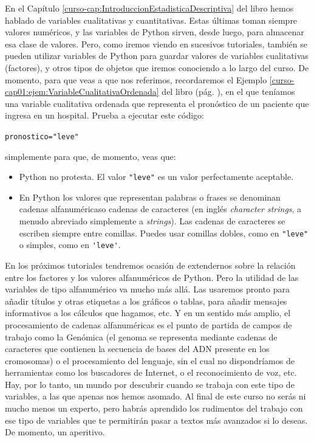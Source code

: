 \documentclass[10pt,a4paper]{article}\usepackage[]{graphicx}\usepackage[]{color}
\makeatletter
\newcommand{\hlstr}[1]{\textcolor[rgb]{0.192,0.494,0.8}{#1}}%
\newcommand{\hlstd}[1]{\textcolor[rgb]{0.345,0.345,0.345}{#1}}%
\newcommand{\hlkwb}[1]{\textcolor[rgb]{0.69,0.353,0.396}{#1}}%
\newenvironment{kframe}{%
 \def\at@end@of@kframe{}%
 \ifinner\ifhmode%
  \def\at@end@of@kframe{\end{minipage}}%
  \begin{minipage}{\columnwidth}%
 \fi\fi%
 \def\FrameCommand##1{\hskip\@totalleftmargin \hskip-\fboxsep
 \colorbox{shadecolor}{##1}\hskip-\fboxsep
     \hskip-\linewidth \hskip-\@totalleftmargin \hskip\columnwidth}%
 \MakeFramed {\advance\hsize-\width
   \@totalleftmargin\z@ \linewidth\hsize
   \@setminipage}}%
 {\par\unskip\endMakeFramed%
 \at@end@of@kframe}
\newenvironment{knitrout}{}{} %
\newcounter {cont01}
\makeatother
\begin{document}
En el Capítulo \ref{curso-cap:IntroduccionEstadisticaDescriptiva} del libro hemos hablado de variables cualitativas y cuantitativas. Estas últimas toman siempre valores numéricos, y las variables de Python sirven, desde luego, para almacenar esa clase de valores. Pero, como iremos viendo en sucesivos tutoriales, también se pueden utilizar variables de Python para guardar valores de variables cualitativas (factores), y otros tipos de objetos que iremos conociendo a lo largo del curso. De momento, para que veas a que nos referimos, recordaremos el Ejemplo \ref{curso-cap01:ejem:VariableCualitativaOrdenada} del libro (pág. \pageref{curso-cap01:ejem:VariableCualitativaOrdenada}), en el que teníamos una variable cualitativa ordenada que representa el pronóstico de un paciente que ingresa en un hospital. Prueba a ejecutar este código:
\begin{knitrout}
\color{fgcolor}\begin{kframe}
\begin{alltt}
\hlstd{pronostico} \hlkwb{=} \hlstr{"leve"}
\end{alltt}
\end{kframe}
\end{knitrout}
simplemente para que, de momento, veas que:
\begin{itemize}
  \item Python no protesta. El valor \verb#"leve"# es un valor perfectamente aceptable.
  \item En Python los valores que representan palabras o frases se denominan {\sf cadenas alfanuméricas}o {\sf cadenas de caracteres} (en inglés {\em character strings}, a menudo abreviado simplemente a {\em strings}). Las cadenas de caracteres se escriben siempre entre comillas. Puedes usar comillas dobles, como en \verb#"leve"# o simples, como en  \verb#'leve'#.
\end{itemize}
En los próximos tutoriales tendremos ocasión de extendernos sobre la relación entre los factores y los valores alfanuméricos de Python. Pero la utilidad de las variables de tipo alfanumérico va mucho más allá. Las usaremos pronto para añadir títulos y otras etiquetas a los gráficos o tablas, para añadir mensajes informativos a los cálculos que hagamos, etc. Y en un sentido más amplio, el procesamiento de cadenas alfanuméricas es el punto de partida de campos de trabajo como la Genómica (el genoma se representa mediante cadenas de caracteres que contienen la secuencia de bases del ADN presente en los cromosomas) o el procesamiento del lenguaje, sin el cual no dispondríamos de herramientas como los buscadores  de Internet, o el reconocimiento de voz, etc. Hay, por lo tanto, un mundo por descubrir cuando se trabaja con este tipo de variables, a las que apenas nos hemos asomado. Al final de este curso no serás ni mucho menos un experto, pero habrás aprendido los rudimentos del trabajo con ese tipo de variables que te permitirán pasar a textos más avanzados si lo deseas. De momento, un aperitivo.
\end{document}
